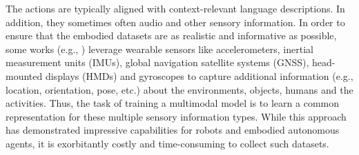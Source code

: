 \documentclass[10pt,journal,compsoc]{IEEEtran}
\begin{document}
	The actions are typically aligned with context-relevant language descriptions. In addition, they sometimes often audio and other sensory information. In order to ensure that the embodied datasets are as realistic and informative as possible, some works (e.g., \cite{xu2023towards,fan2024emhi,ashok2024egocentric+}) leverage wearable sensors like accelerometers, inertial measurement units (IMUs), global navigation satellite systems (GNSS), head-mounted displays (HMDs) and gyroscopes to capture additional information (e.g., location, orientation, pose, etc.) about the environments, objects, humans and the activities. Thus, the task of training a multimodal model is to learn a common representation for these multiple sensory information types. While this approach has demonstrated impressive capabilities for robots and embodied autonomous agents, it is exorbitantly costly and time-consuming to collect such datasets. 
	
\end{document}
